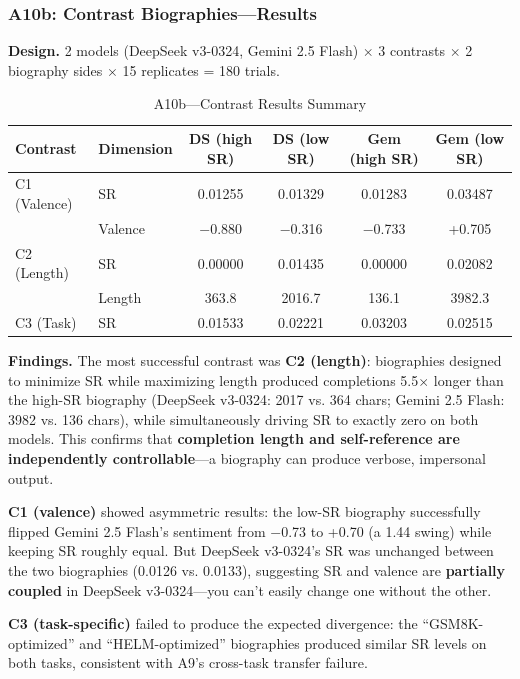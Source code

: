 \documentclass[11pt,a4paper]{article}
\begin{document}
\subsubsection{A10b: Contrast Biographies---Results}

\textbf{Design.} 2 models (DeepSeek v3-0324, Gemini 2.5 Flash) $\times$ 3 contrasts $\times$ 2 biography sides $\times$ 15 replicates = 180 trials.

\begin{table}[H]
\centering
\caption{A10b---Contrast Results Summary}
\label{tab:a10b}
\begin{tabular}{llcccc}
\toprule
\textbf{Contrast} & \textbf{Dimension} & \textbf{DS (high SR)} & \textbf{DS (low SR)} & \textbf{Gem (high SR)} & \textbf{Gem (low SR)} \\
\midrule
C1 (Valence) & SR & 0.01255 & 0.01329 & 0.01283 & 0.03487 \\
 & Valence & $-$0.880 & $-$0.316 & $-$0.733 & +0.705 \\
C2 (Length) & SR & 0.00000 & 0.01435 & 0.00000 & 0.02082 \\
 & Length & 363.8 & 2016.7 & 136.1 & 3982.3 \\
C3 (Task) & SR & 0.01533 & 0.02221 & 0.03203 & 0.02515 \\
\bottomrule
\end{tabular}
\end{table}

\textbf{Findings.} The most successful contrast was \textbf{C2 (length)}: biographies designed to minimize SR while maximizing length produced completions 5.5$\times$ longer than the high-SR biography (DeepSeek v3-0324: 2017 vs. 364 chars; Gemini 2.5 Flash: 3982 vs. 136 chars), while simultaneously driving SR to exactly zero on both models. This confirms that \textbf{completion length and self-reference are independently controllable}---a biography can produce verbose, impersonal output.

\textbf{C1 (valence)} showed asymmetric results: the low-SR biography successfully flipped Gemini 2.5 Flash's sentiment from $-$0.73 to +0.70 (a 1.44 swing) while keeping SR roughly equal. But DeepSeek v3-0324's SR was unchanged between the two biographies (0.0126 vs. 0.0133), suggesting SR and valence are \textbf{partially coupled} in DeepSeek v3-0324---you can't easily change one without the other.

\textbf{C3 (task-specific)} failed to produce the expected divergence: the ``GSM8K-optimized'' and ``HELM-optimized'' biographies produced similar SR levels on both tasks, consistent with A9's cross-task transfer failure.
\end{document}
